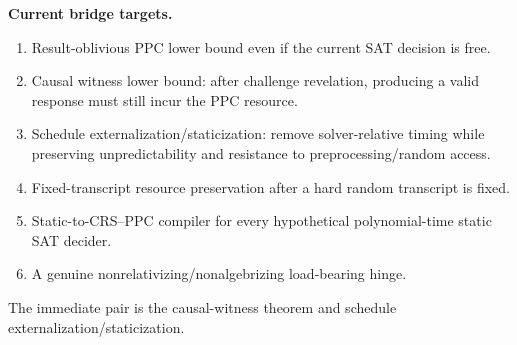 \documentclass[11pt]{article}
\begin{document}
\begin{candidatebox}
\textbf{Current bridge targets.}
\begin{enumerate}
  \item Result-oblivious PPC lower bound even if the current SAT decision is free.
  \item Causal witness lower bound: after challenge revelation, producing a valid response must
        still incur the PPC resource.
  \item Schedule externalization/staticization: remove solver-relative timing while preserving
        unpredictability and resistance to preprocessing/random access.
  \item Fixed-transcript resource preservation after a hard random transcript is fixed.
  \item Static-to-CRS--PPC compiler for every hypothetical polynomial-time static SAT decider.
  \item A genuine nonrelativizing/nonalgebrizing load-bearing hinge.
\end{enumerate}
The immediate pair is the causal-witness theorem and schedule externalization/staticization.
\end{candidatebox}
\end{document}
